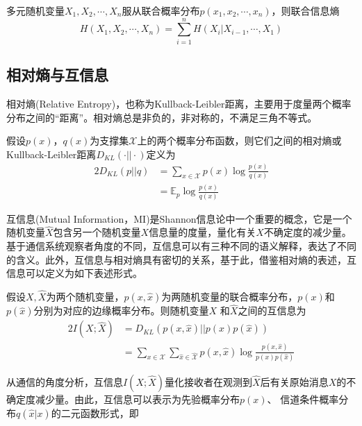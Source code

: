 \begin{theorem}\label{theorm:multi_joint_entropy_}
	多元随机变量$X_1,X_2,\cdots,X_n$服从联合概率分布$p(x_1,x_2,\cdots,x_n)$，则联合信息熵
	\begin{equation}\label{eq:joint_entropy}
	H(X_1,X_2,\cdots,X_n)=\sum_{i=1}^{n}H(X_i|X_{i-1},\cdots,X_1)
	\end{equation}
\end{theorem}
\subsection{相对熵与互信息}\label{sec:entropty_mutual_information}
相对熵(Relative Entropy)，也称为Kullback-Leibler\cite{cover2006elements,erven2014renyi}距离，主要用于度量两个概率分布之间的``距离''。相对熵总是非负的，非对称的，不满足三角不等式。
\begin{definition}
	假设$p(x)$，$q(x)$为支撑集$\mathcal{X}$上的两个概率分布函数，则它们之间的相对熵或Kullback-Leibler距离$D_{KL}(\cdot||\cdot)$定义为
	\begin{alignat}{2}
		D_{KL}(p||q)
		& =\sum_{x \in \mathcal{X}}p(x) \log \frac{p(x)}{q(x)}\\
		& 	 = \mathbb{E}_{p}\log \frac{p(x)}{q(x)}
	\end{alignat}
\end{definition}
互信息(Mutual Information，MI)是Shannon信息论中一个重要的概念，它是一个随机变量$\hat{X}$包含另一个随机变量$X$信息量的度量，量化有关$X$不确定度的减少量。基于通信系统观察者角度的不同，互信息可以有三种不同的语义解释，表达了不同的含义。此外，互信息与相对熵具有密切的关系，基于此，借鉴相对熵的表述，互信息可以定义为如下表述形式。
\begin{definition}
	假设$X,\hat{X}$为两个随机变量，$p(x,\hat{x})$为两随机变量的联合概率分布，$p(x)$和$p(\hat{x})$分别为对应的边缘概率分布。则随机变量$X$ 和$\hat{X}$之间的互信息为
	\begin{alignat}{2}
		I(X;\hat{X})
		& = D_{KL}\left(p(x,\hat{x})||p(x)p(\hat{x})\right)\\
		& = \sum_{x\in \mathcal{X}}\sum_{\hat{x}\in \hat{\mathcal{X}}}p(x,\hat{x})\log \frac{p(x,\hat{x})}{p(x)p(\hat{x})}
	\end{alignat}
\end{definition}
从通信的角度分析，互信息$I(X;\hat{X})$量化接收者在观测到$\hat{X}$后有关原始消息$X$的不确定度减少量。由此，互信息可以表示为先验概率分布$p(x)$、 信道条件概率分布$q(\hat{x}|x)$的二元函数形式，即
